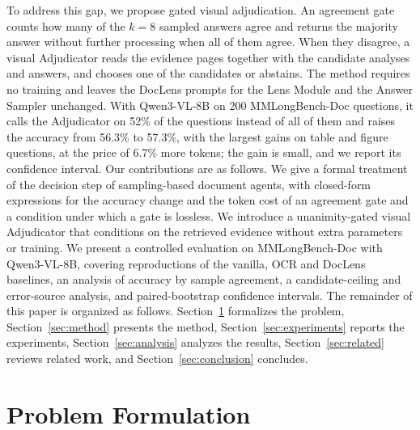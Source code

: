 To address this gap, we propose gated visual adjudication. An agreement gate counts how many of the $k=8$ sampled answers agree and returns the majority answer without further processing when all of them agree. When they disagree, a visual Adjudicator reads the evidence pages together with the candidate analyses and answers, and chooses one of the candidates or abstains. The method requires no training and leaves the DocLens prompts for the Lens Module and the Answer Sampler unchanged. With Qwen3-VL-8B on 200 MMLongBench-Doc questions, it calls the Adjudicator on 52\% of the questions instead of all of them and raises the accuracy from 56.3\% to 57.3\%, with the largest gains on table and figure questions, at the price of 6.7\% more tokens; the gain is small, and we report its confidence interval. Our contributions are as follows. We give a formal treatment of the decision step of sampling-based document agents, with closed-form expressions for the accuracy change and the token cost of an agreement gate and a condition under which a gate is lossless. We introduce a unanimity-gated visual Adjudicator that conditions on the retrieved evidence without extra parameters or training. We present a controlled evaluation on MMLongBench-Doc with Qwen3-VL-8B, covering reproductions of the vanilla, OCR and DocLens baselines, an analysis of accuracy by sample agreement, a candidate-ceiling and error-source analysis, and paired-bootstrap confidence intervals. The remainder of this paper is organized as follows. Section~\ref{sec:formulation} formalizes the problem, Section~\ref{sec:method} presents the method, Section~\ref{sec:experiments} reports the experiments, Section~\ref{sec:analysis} analyzes the results, Section~\ref{sec:related} reviews related work, and Section~\ref{sec:conclusion} concludes.

\section{Problem Formulation}
\label{sec:formulation}

